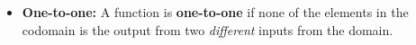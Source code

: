 \documentclass[a4paper,12pt]{book}
\newcounter{question}
\begin{document}
{\begin{introNOHEAD}{}
\begin{itemize}
                    
            \item   \textbf{One-to-one:}
                    A function is \textbf{one-to-one} if none of the
                    elements in the codomain is the output from two
                    \textit{different} inputs from the domain.
        \end{itemize}

        ~\\ ~\\ ~\\
    \end{introNOHEAD}

    }{}


\end{document}
